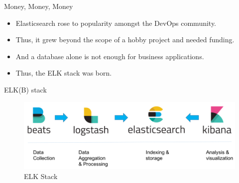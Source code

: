 \documentclass[compress,aspectratio=169]{beamer}
\begin{document}
\begin{frame}{Money, Money, Money}
\begin{itemize}
  \item Elasticsearch rose to popularity amongst the DevOps community.
  \item Thus, it grew beyond the scope of a hobby project and needed funding.
  \item And a database alone is not enough for business applications.
  \item Thus, the ELK stack was born.
\end{itemize}
\end{frame}

\begin{frame}{ELK(B) stack}
\begin{center}
\begin{figure}
  \includegraphics[width=\textwidth]{elk.png}
  \caption{ELK Stack}
\end{figure}
\end{center}
\end{frame}
\end{document}
